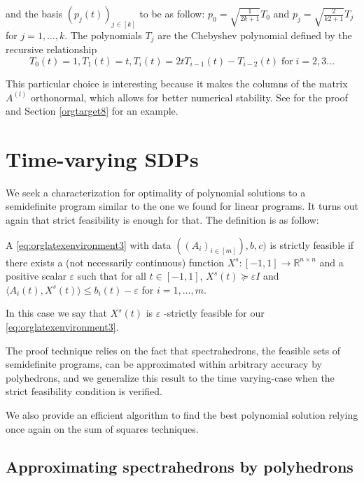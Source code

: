 \documentclass[moor]{informs1}
\begin{document}
and the basis \((p_j(t))_{j \in [k]}\) to be as follow: \(p_0 = \sqrt{\frac{1}{2k+1}}T_0\) and \(p_j = \sqrt{\frac{2}{k2+1}}T_j\) for \(j=1,\ldots,k\). The polynomials \(T_j\) are the Chebyshev polynomial defined by the recursive relationship
$$T_0(t) = 1, T_1(t) = t, T_i(t) = 2tT_{i-1}(t) - T_{i-2}(t)  \; \text{for} \; i=2,3 \ldots$$

This particular choice is interesting because it makes the columns of the matrix \(A^{(l)}\) orthonormal, which allows for better numerical stability. See \cite{Parrilo2004} for the proof and Section \ref{orgtarget8} for an example.


\section{Time-varying SDPs}
\label{sec:orgheadline20}
\label{orgtarget6}
We seek a characterization for optimality of polynomial solutions to a semidefinite program similar to the one we found for linear programs. It turns out again that strict feasibility is enough for that. The definition is as follow:

\begin{definition}
A \ref{eq:orglatexenvironment3} with data \(((A_i)_{i \in [m]}), b, c)\) is strictly feasible if there exists a (not necessarily continuous) function \(X^{s}: [-1, 1] \rightarrow \mathbb R^{n \times n}\) and a positive scalar \(\varepsilon\) such that for all \(t \in [-1, 1]\), \(X^{s}(t) \succeq \varepsilon I\) and \(\langle A_i(t), X^s(t) \rangle \le b_i(t) - \varepsilon\) for \(i = 1, \ldots, m\).

In this case we say that \(X^s(t)\) is \(\varepsilon\) -strictly feasible for our \ref{eq:orglatexenvironment3}.
\end{definition}

The proof technique relies on the fact that spectrahedrons, the feasible sets of semidefinite programs, can be approximated within arbitrary accuracy by polyhedrons, and we generalize this result to the time varying-case when the strict feasibility condition is verified.

We also provide an efficient algorithm to find the best polynomial solution relying once again on the sum of squares techniques.

\subsection{Approximating spectrahedrons by polyhedrons}
\label{sec:orgheadline17}
\end{document}

